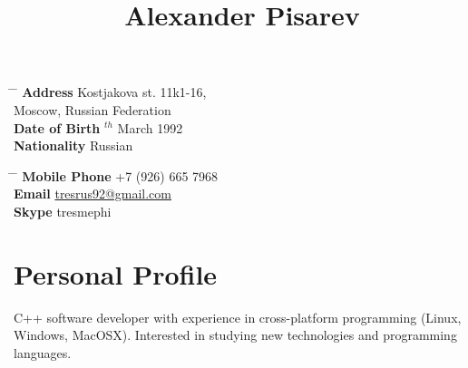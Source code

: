\documentclass[10pt]{article} %
\begin{document}

\title{Alexander Pisarev} %


\parbox{0.5\textwidth}{ %
\begin{tabbing} %
\hspace{3cm} \= \hspace{4cm} \= \kill %
{\bf Address} \> Kostjakova st. 11k1-16,\\ %
\> Moscow, Russian Federation \\ %
{\bf Date of Birth} $^{th}$ March 1992 \\ %
{\bf Nationality} \> Russian %
\end{tabbing}}
\hfill %
\parbox{0.5\textwidth}{ %
\begin{tabbing} %
\hspace{3cm} \= \hspace{4cm} \= \kill %
{\bf Mobile Phone} \> +7 (926) 665 7968 \\ %
{\bf Email} \> \href{mailto:tresrus92@gmail.com}{tresrus92@gmail.com} \\ %
{\bf Skype} \> tresmephi \\ %
\end{tabbing}}


\section{Personal Profile}

C++ software developer with experience in cross-platform programming (Linux, Windows, MacOSX). Interested in studying new technologies and programming languages.

\end{document}
